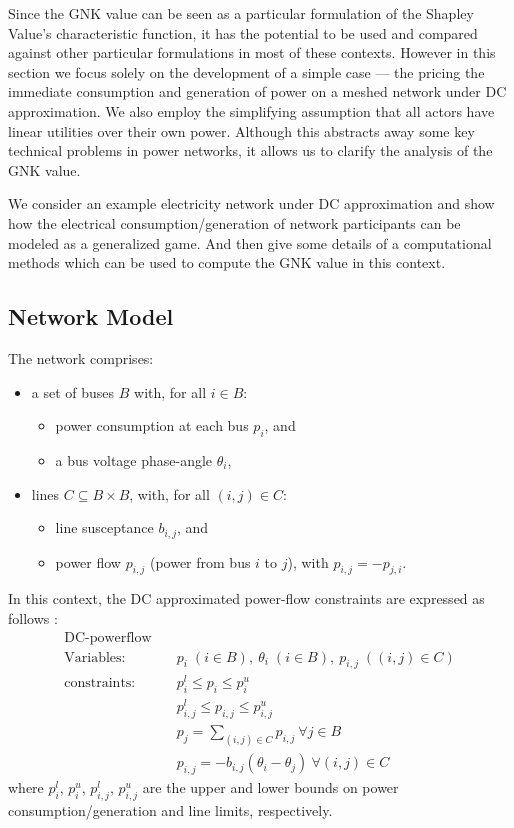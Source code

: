 Since the GNK value can be seen as a particular formulation of the Shapley Value's characteristic function, it has the potential to be used and compared against other particular formulations in most of these contexts.
However in this section we focus solely on the development of a simple case --- the pricing the immediate consumption and generation of power on a meshed network under DC approximation.
We also employ the simplifying assumption that all actors have linear utilities over their own power.
Although this abstracts away some key technical problems in power networks, it allows us to clarify the analysis of the GNK value.

We consider an example electricity network under DC approximation and show how the electrical consumption/generation of network participants can be modeled as a generalized game. And then give some details of a computational methods which can be used to compute the GNK value in this context.

\subsection{Network Model}\label{sec:the_setup}


The network comprises:
\begin{itemize}
    \item a set of buses $B$ with, for all $i\in B$:
    \begin{itemize} 
        \item power consumption at each bus $p_i$, and 
        \item a bus voltage phase-angle $\theta_i$,
    \end{itemize}
    \item lines 
    $C\subseteq B\times B$, with, for all $(i,j)\in C$: 
        \begin{itemize} 
        \item line susceptance $b_{i,j}$, and 
        \item power flow $p_{i,j}$ (power from bus $i$ to $j$), with $p_{i,j}=-p_{j,i}$. 
    \end{itemize}
\end{itemize}
In this context, the DC approximated power-flow constraints are expressed as follows \cite{Wang1}:
\begin{equation}
\label{dcopf1}
\begin{aligned}
\text{DC-powerflow} \quad& \\
\text{Variables:} \quad&  p_i\; (i\in B),\ \theta_i\; (i\in B),\ p_{i,j}\; ((i,j)\in C) \\
\text{constraints:} \quad& p_i^{l}\le p_i \le p_i^{u} \\
&p_{i,j}^l \le p_{i,j} \le p_{i,j}^u \\
&p_j = \sum_{(i,j)\in C}p_{i,j}~\forall j\in B\\
&p_{i,j} = -b_{i,j}(\theta_i - \theta_j) ~\forall(i,j)\in C
\end{aligned}
\end{equation}
where $p_i^{l}$, $p_i^{u}$, $p_{i,j}^l$, $p_{i,j}^u$ are the upper and lower bounds on power consumption/generation and line limits, respectively.

